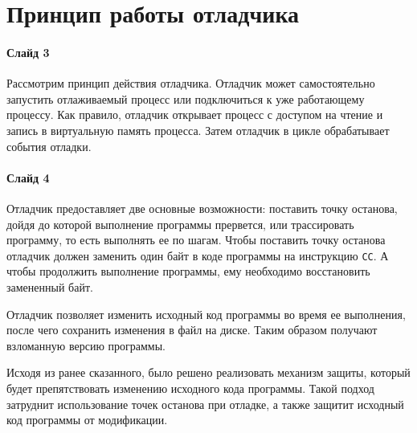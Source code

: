 
\section{Принцип работы отладчика }

\paragraph{Слайд 3}\mbox{}\par

Рассмотрим принцип действия отладчика. Отладчик может самостоятельно запустить
отлаживаемый процесс или подключиться к уже работающему процессу. Как правило,
отладчик открывает процесс с доступом на чтение и запись в виртуальную память
процесса. Затем отладчик в цикле обрабатывает события отладки.

\paragraph{Слайд 4}\mbox{}\par
Отладчик предоставляет две основные возможности: поставить точку останова, дойдя
до которой выполнение программы прервется, или трассировать программу, то есть
выполнять ее по шагам. Чтобы поставить точку останова отладчик должен заменить
один байт в коде программы на инструкцию \verb!CC!. А чтобы продолжить
выполнение программы, ему необходимо восстановить замененный байт. 

Отладчик позволяет изменить исходный код программы во время ее выполнения, после
чего сохранить изменения в файл на диске. Таким образом получают взломанную
версию программы.

Исходя из ранее сказанного, было решено реализовать механизм защиты, который
будет препятствовать изменению исходного кода программы. Такой подход затруднит
использование точек останова при отладке, а также защитит исходный код программы
от модификации.
